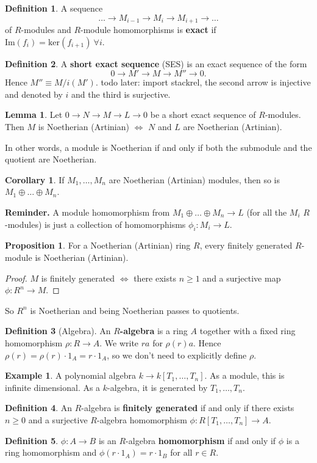 \documentclass{article}
\theoremstyle{definition}
\newtheorem{lemma}[theorem]{Lemma}
\newtheorem{cor}[theorem]{Corollary}
\newtheorem{prop}[theorem]{Proposition}
\newtheorem{example}{Example}[section]
\newtheorem{defn}{Definition}[section]
\begin{document}
\begin{defn}
    A sequence $$\ldots \to M_{i-1} \to M_i \to M_{i+1} \to \ldots$$
    of $R$-modules and $R$-module homomorphisms is \textbf{exact} if $\text{Im}(f_i)= \text{ker}(f_{i+1}) ~\forall i$.
\end{defn}
\begin{defn}
    A \textbf{short exact sequence} (SES) is an exact sequence of the form $$0 \to M' \to M \to M'' \to 0.$$
    Hence $M'' \equiv M/i(M')$.
    todo later: import stackrel, the second arrow is injective and denoted by $i$ and the third is surjective.
\end{defn}
\begin{lemma}
    Let $0 \to N \to M \to L \to 0$ be a short exact sequence of $R$-modules. Then $M$ is Noetherian (Artinian) $\iff$ $N$ and $L$ are Noetherian (Artinian).
    \vspace{1mm}
     
    In other words, a module is Noetherian if and only if both the submodule and the quotient are Noetherian.
\end{lemma}
\begin{cor}
    If $M_1,\ldots,M_n$ are Noetherian (Artinian) modules, then so is $M_1 \oplus \ldots \oplus M_n$.
\end{cor}
\textbf{Reminder.} A module homomorphism from $M_1 \oplus \ldots \oplus M_n \to L$ (for all the $M_i$ $R$-modules) is just a collection of homomorphisms $\phi_i: M_i \to L$. 
\begin{prop}
    For a Noetherian (Artinian) ring $R$, every finitely generated $R$-module is Noetherian (Artinian).
\end{prop}
\begin{proof}
    $M$ is finitely generated $\iff$ there exists $n\ge 1$ and a surjective map $\phi : R^n \to M$.
\end{proof}
So $R^n$ is Noetherian and being Noetherian passes to quotients.

\begin{defn}[Algebra]
    An \textbf{$R$-algebra} is a ring $A$ together with a fixed ring homomorphism $\rho: R \to A$. We write $ra$ for $\rho(r)a$. Hence $\rho(r) = \rho(r) \cdot 1_A = r \cdot 1_A$, so we don't need to explicitly define $\rho$.
\end{defn}
\begin{example}
    A polynomial algebra $k \to k[T_1,\ldots,T_n]$. As a module, this is infinite dimensional. As a $k$-algebra, it is generated by $T_1,\ldots,T_n$.
\end{example}
\begin{defn}
    An $R$-algebra is \textbf{finitely generated} if and only if there exists $n \ge 0$ and a surjective $R$-algebra homomorphism $\phi: R[T_1,\ldots,T_n] \to A$. 
\end{defn}
\begin{defn}
    $\phi: A \to B$ is an $R$-algebra \textbf{homomorphism} if and only if $\phi$ is a ring homomorphism and $\phi(r \cdot 1_A) = r \cdot 1_B$ for all $r \in R$.
\end{defn}
\end{document}
